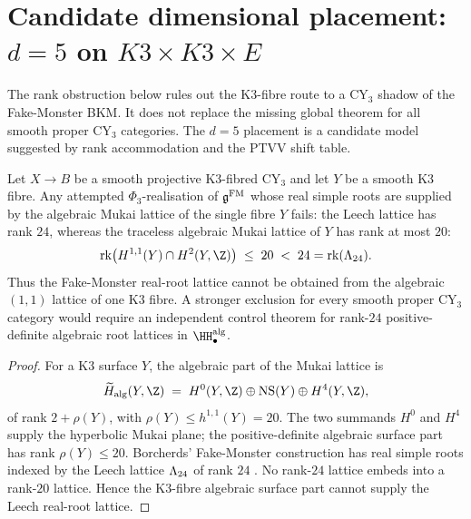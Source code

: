 \section{Candidate dimensional placement: \texorpdfstring{$d = 5$}{d = 5} on \texorpdfstring{$K3 \times K3 \times E$}{K3 x K3 x E}}
\label{sec:fm-dimensional-placement}

The rank obstruction below rules out the K3-fibre route to a CY$_3$ shadow of the Fake-Monster BKM. It does not replace the missing global theorem for all smooth proper CY$_3$ categories. The $d=5$ placement is a candidate model suggested by rank accommodation and the PTVV shift table.

\begin{proposition}
\label{prop:fm-rank-obstruction-no-cy3}
Let $X\to B$ be a smooth projective K3-fibred CY$_3$ and let
$Y$ be a smooth K3 fibre. Any attempted $\Phi_3$-realisation of
$\mathfrak{g}^{\mathrm{FM}}$ whose real simple roots are supplied by the algebraic Mukai
lattice of the single fibre $Y$ fails: the Leech lattice has rank $24$,
whereas the traceless algebraic Mukai lattice of $Y$ has rank at most
$20$:
\[
 \mathrm{rk}\bigl(H^{1,1}(Y)\cap H^2(Y,\Z)\bigr)
 \;\leq\;20\;<\;24=\mathrm{rk}(\Leech).
\]
Thus the Fake-Monster real-root lattice cannot be obtained from the
algebraic $(1,1)$ lattice of one K3 fibre. A stronger exclusion for every
smooth proper CY$_3$ category would require an independent control theorem
for rank-$24$ positive-definite algebraic root lattices in
$\HH_\bullet^{\mathrm{alg}}$.
\end{proposition}

\begin{proof}
For a K3 surface $Y$, the algebraic part of the Mukai lattice is
\[
 \widetilde H_{\mathrm{alg}}(Y,\Z)
 \;=\;H^0(Y,\Z)\oplus \operatorname{NS}(Y)\oplus H^4(Y,\Z),
\]
of rank $2+\rho(Y)$, with $\rho(Y)\leq h^{1,1}(Y)=20$. The two summands
$H^0$ and $H^4$ supply the hyperbolic Mukai plane; the positive-definite
algebraic surface part has rank $\rho(Y)\leq20$. Borcherds'
Fake-Monster construction has real simple roots indexed by the Leech
lattice $\Lambda_{24}$ of rank $24$ \cite[Theorem~1]{Borcherds1990Adv}.
No rank-$24$ lattice embeds into a rank-$20$ lattice. Hence the K3-fibre
algebraic surface part cannot supply the Leech real-root lattice.
\end{proof}

